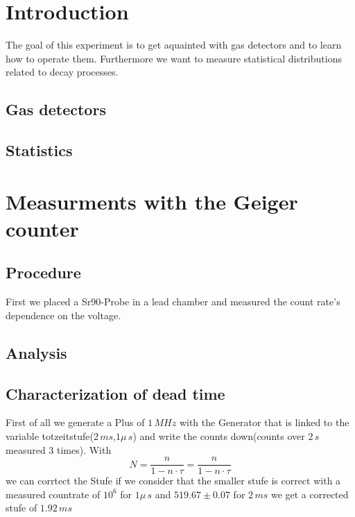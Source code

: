 \tableofcontents
\newpage
\listoffigures

\listoftables

\skippage

\setcounter{page}{1}
\restoregeometry
\thispagestyle{fancy}


\section{Introduction}

The goal of this experiment is to get aquainted with gas detectors and to learn how to operate them. Furthermore we want to measure statistical distributions related to decay processes.

\subsection{Gas detectors}

\subsection{Statistics}

\section{Measurments with the Geiger counter}

\subsection{Procedure}

First we placed a Sr90-Probe in a lead chamber and measured the count rate's dependence on the voltage. 

\subsection{Analysis}
\subsection{Characterization of dead time}

First of all we generate a Plus of $1\,MHz$ with the Generator
that is linked to the variable totzeitstufe($2\,ms$,$1\mu\,s$) and write the counts down(counts over $2\,s$ measured $3$ times).
With
\begin{equation}
N =\frac{n}{1-n\cdot\tau}=\frac{n}{1-n\cdot\tau}
\end{equation}
 we can corrtect the Stufe if we consider that the smaller stufe is correct 
with a measured countrate of $10^6$ for $1\mu\,s$ and 
$519.67\pm0.07$ for $2\,ms$ we get a corrected stufe of $1.92\,ms$

